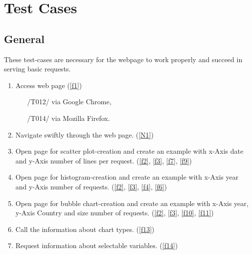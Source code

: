 \section{Test Cases}



\subsection{General}

These test-cases are necessary for the webpage to work 
properly and succeed in serving basic requests.

\begin{enumerate}[label={{/T}\itemnumber*{/}}, series=test]

\item Access web page (\ref{f1})
\begin{enumerate}
  \item[/T012/] via Google Chrome,
  \item[/T014/] via Mozilla Firefox.
\end{enumerate}
\label{t10}

\item Navigate swiftly through the web page. (\ref{N1}) 
\label{t11}

\item Open page for scatter plot-creation and create an example
      with x-Axis date and y-Axis number of lines per request. (\ref{f2}, \ref{f3}, \ref{f7}, \ref{f9})
\label{t12}

\item Open page for histogram-creation and create an example
      with x-Axis year and y-Axis number of requests. (\ref{f2}, \ref{f3}, \ref{f4}, \ref{f6})
\label{t13}

\item Open page for bubble chart-creation and create an example
      with x-Axis year, y-Axis Country and size number of requests. (\ref{f2}, \ref{f3}, \ref{f10}, \ref{f11})
\label{t14}

\item Call the information about chart types. (\ref{f13})
\label{t15}

\item Request information about selectable variables. (\ref{f14})
\label{t16}

\end{enumerate}

